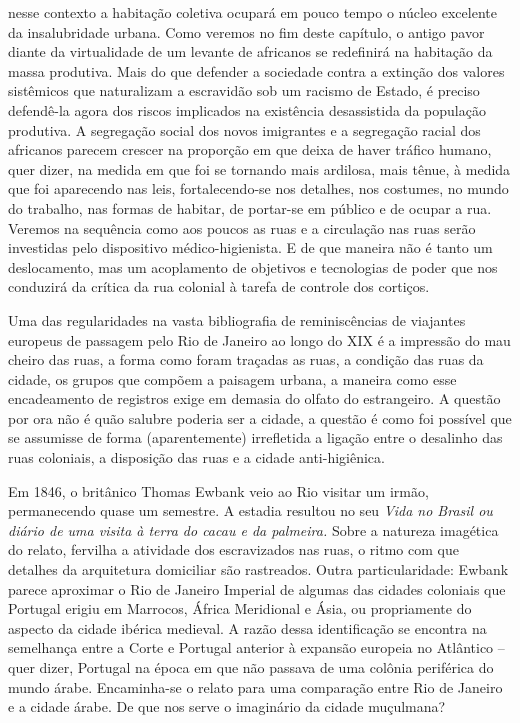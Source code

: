 nesse contexto a habitação coletiva ocupará em pouco tempo o núcleo
excelente da insalubridade urbana. Como veremos no fim deste capítulo, o
antigo pavor diante da virtualidade de um levante de africanos se
redefinirá na habitação da massa produtiva. Mais do que defender a
sociedade contra a extinção dos valores sistêmicos que naturalizam a
escravidão sob um racismo de Estado, é preciso defendê-la agora dos
riscos implicados na existência desassistida da população produtiva. A
segregação social dos novos imigrantes e a segregação racial dos
africanos parecem crescer na proporção em que deixa de haver tráfico
humano, quer dizer, na medida em que foi se tornando mais ardilosa, mais
tênue, à medida que foi aparecendo nas leis, fortalecendo-se nos
detalhes, nos costumes, no mundo do trabalho, nas formas de habitar, de
portar-se em público e de ocupar a rua. Veremos na sequência como aos
poucos as ruas e a circulação nas ruas serão investidas pelo dispositivo
médico-higienista. E de que maneira não é tanto um deslocamento, mas um
acoplamento de objetivos e tecnologias de poder que nos conduzirá da
crítica da rua colonial à tarefa de controle dos cortiços.

Uma das regularidades na vasta bibliografia de reminiscências de
viajantes europeus de passagem pelo Rio de Janeiro ao longo do XIX é a
impressão do mau cheiro das ruas, a forma como foram traçadas as ruas, a
condição das ruas da cidade, os grupos que compõem a paisagem urbana, a
maneira como esse encadeamento de registros exige em demasia do olfato
do estrangeiro. A questão por ora não é quão salubre poderia ser a
cidade, a questão é como foi possível que se assumisse de forma
(aparentemente) irrefletida a ligação entre o desalinho das ruas
coloniais, a disposição das ruas e a cidade anti-higiênica.

Em 1846, o britânico Thomas Ewbank veio ao Rio visitar um irmão,
permanecendo quase um semestre. A estadia resultou no seu \emph{Vida no
Brasil ou diário de uma visita à terra do cacau e da palmeira.} Sobre a
natureza imagética do relato, fervilha a atividade dos escravizados nas
ruas, o ritmo com que detalhes da arquitetura domiciliar são rastreados.
Outra particularidade: Ewbank parece aproximar o Rio de Janeiro Imperial
de algumas das cidades coloniais que Portugal erigiu em Marrocos, África
Meridional e Ásia, ou propriamente do aspecto da cidade ibérica
medieval. A razão dessa identificação se encontra na semelhança entre a
Corte e Portugal anterior à expansão europeia no Atlântico -- quer
dizer, Portugal na época em que não passava de uma colônia periférica do
mundo árabe. Encaminha-se o relato para uma comparação entre Rio de
Janeiro e a cidade árabe. De que nos serve o imaginário da cidade
muçulmana?

